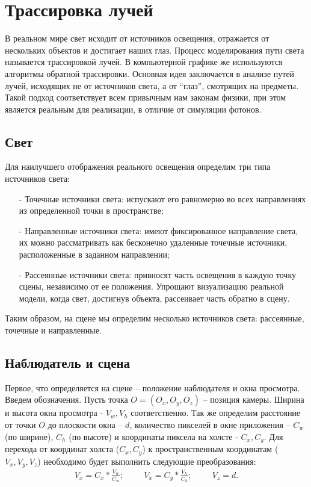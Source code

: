 \section{Трассировка лучей}

В реальном мире свет исходит от источников освещения, отражается от
нескольких объектов и достигает наших глаз. Процесс моделирования пути света называется трассировкой лучей. В компьютерной графике же используются алгоритмы обратной трассировки. Основная идея заключается в анализе путей лучей, исходящих не от источников света, а от “глаз”, смотрящих на предметы. Такой подход соответствует всем привычным нам законам физики, при этом является реальным для реализации, в отличие от симуляции фотонов. \cite{b4}

\subsection{Свет}

Для наилучшего отображения реального освещения определим три типа
источников света:
\begin{itemize}[label=\arabic*)]
	\item[-] Точечные источники света: испускают его равномерно во всех направлениях из определенной точки в пространстве;
	\item[-] Направленные источники света: имеют фиксированное направление света, их можно рассматривать как бесконечно удаленные точечные источники, расположенные в заданном направлении;
	\item[-] Рассеянные источники света: привносят часть освещения в каждую точку сцены, независимо от ее положения. Упрощают визуализацию реальной модели, когда свет, достигнув объекта, рассеивает часть обратно в сцену.
\end{itemize}

Таким образом, на сцене мы определим несколько источников света: рассеянные, точечные и направленные.

\subsection{Наблюдатель и сцена}

Первое, что определяется на сцене – положение наблюдателя и окна просмотра. Введем обозначения. Пусть точка $O = (O_{x}, O_{y}, O_{z})$ – позиция камеры. Ширина и высота окна просмотра - $V_{w}, V_{h}$ соответственно. Так же определим расстояние от точки $O$ до плоскости окна – $d$, количество пикселей в окне приложения – $C_{w}$ (по ширине), $C_{h}$ (по высоте) и координаты пиксела на холсте - $C_{x}, C_{y}$.
Для перехода от координат холста ($C_{x}, C_{y}$) к пространственным координатам ($V_{x}, V_{y}, V_{z}$) необходимо будет выполнить следующие преобразования:
\begin{gather}
	V_{x} = C_{x}*\frac{V_{w}}{C_{w}};\hspace{1cm}V_{x} = C_{y}*\frac{V_{h}}{C_{h}};\hspace{1cm}V_{z} = d.
\end{gather}

